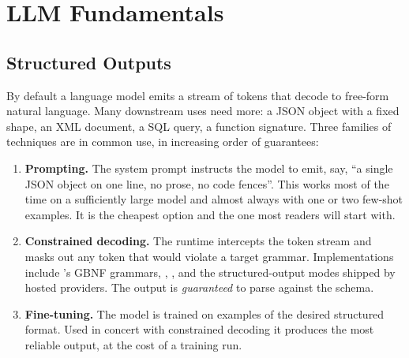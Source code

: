 
\chapter{LLM Fundamentals}
\label{ch:fundamentals}


\section{Structured Outputs}
\label{sec:structured}

By default a language model emits a stream of tokens that decode to
free-form natural language. Many downstream uses need more: a JSON
object with a fixed shape, an XML document, a SQL query, a function
signature. Three families of techniques are in common use, in
increasing order of guarantees:

\begin{enumerate}[label=(\arabic*)]
\item \textbf{Prompting.} The system prompt instructs the model to
  emit, say, ``a single JSON object on one line, no prose, no code
  fences''. This works most of the time on a sufficiently large
  model and almost always with one or two few-shot examples. It is
  the cheapest option and the one most readers will start with.
\item \textbf{Constrained decoding.} The runtime intercepts the
  token stream and masks out any token that would violate a target
  grammar. Implementations include 's GBNF grammars,
  , , and the structured-output
  modes shipped by hosted providers. The output is \emph{guaranteed}
  to parse against the schema.
\item \textbf{Fine-tuning.} The model is trained on examples of the
  desired structured format. Used in concert with constrained
  decoding it produces the most reliable output, at the cost of a
  training run.
\end{enumerate}


